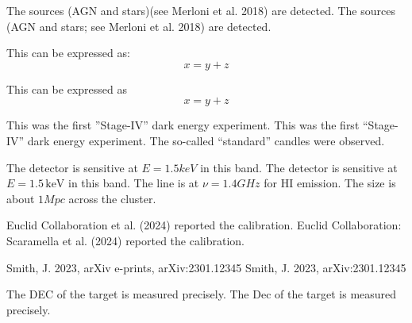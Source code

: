 \documentclass{article}
\begin{document}
The sources (AGN and stars)(see Merloni et al. 2018) are detected. %
The sources (AGN and stars; see Merloni et al. 2018) are detected. %

\begin{acknowledgements} %

This can be expressed as:
\begin{equation} %
x = y + z
\end{equation}

This can be expressed as
\begin{equation} %
x = y + z
\end{equation}

This was the first ''Stage-IV'' dark energy experiment. %
This was the first ``Stage-IV'' dark energy experiment. %
The so-called ``standard'' candles were observed. %

The detector is sensitive at $E=1.5keV$ in this band. %
The detector is sensitive at $E=1.5\,\mathrm{keV}$ in this band. %
The line is at $\nu=1.4GHz$ for HI emission. %
The size is about $1Mpc$ across the cluster. %


Euclid Collaboration et al. (2024) reported the calibration. %
Euclid Collaboration: Scaramella et al. (2024) reported the calibration. %


Smith, J. 2023, arXiv e-prints, arXiv:2301.12345 %
Smith, J. 2023, arXiv:2301.12345 %



The DEC of the target is measured precisely. %
The Dec of the target is measured precisely. %


\end{acknowledgements}
\end{document}
